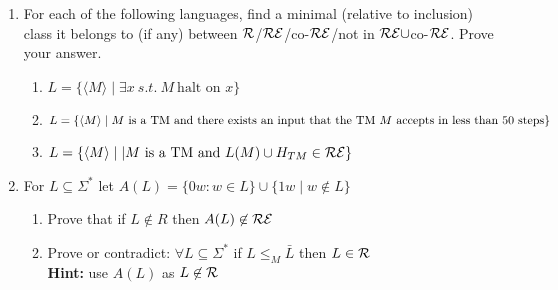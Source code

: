 \documentclass[12pt]{article}
\begin{document}
\begin{enumerate}
\begin{enumerate}
\end{enumerate}

\item  For each of the following languages, find a minimal (relative to
inclusion) class it belongs to (if any) between
$\cal{R}$/$\cal{RE}$/co-$\cal{RE}$/not in
$\cal{RE}\cup$co-$\cal{RE}$. Prove your answer.
\begin{enumerate}
    \item $L = \{\langle M \rangle \mid  \exists x\ s.t.\  M\ \text{halt on } x\}$
   
    \item $L = \{\langle M\rangle \mid M \text{ is a TM and there exists an input that the TM } M \text{ accepts in}\newline\text{ less
than 50 steps}\}$
    \item $L = \{\langle M\rangle \mid | M \text{ is a TM and }L(M) \cup H_{TM} \in \cal{RE}\}$
\end{enumerate}

 \item
For $L \subseteq \Sigma^*$ let $A(L) = \{0w \colon w \in L \} \cup
\{1w \mid w \not\in L\}$
\begin{enumerate}
    \item Prove that if $L \not\in R$ then $A(L) \not\in \cal{RE}$
    \item Prove or contradict: $\forall L \subseteq \Sigma^*$ if $L \leq_M
    \bar{L}$ then $L \in \cal{R}$ \\ \textbf{Hint:} use $A(L)$ as $L \not\in \cal{R}$
\end{enumerate}



\end{enumerate}
\end{document}
